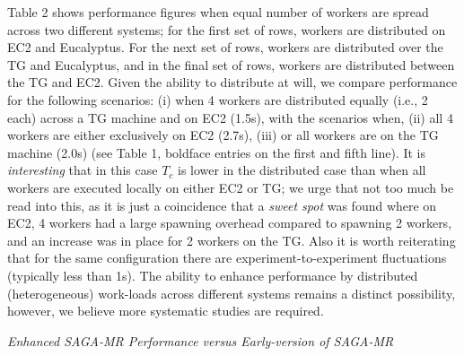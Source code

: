 \documentclass[3p,twocolumn]{elsarticle}
\begin{document}
Table 2 shows performance figures when equal number of workers are
spread across two different systems; for the first set of rows,
workers are distributed on EC2 and Eucalyptus. For the next set of
rows, workers are distributed over the TG and Eucalyptus, and in the
final set of rows, workers are distributed between the TG and EC2.
Given the ability to distribute at will, we compare performance for
the following scenarios: (i) when 4 workers are distributed equally
(i.e., 2 each) across a TG machine and on EC2 (1.5s), with the
scenarios when, (ii) all 4 workers are either exclusively on EC2
(2.7s), (iii) or all workers are on the TG machine (2.0s) (see Table
1, boldface entries on the first and fifth line). It is {\it
  interesting} that in this case $T_c$ is lower in the distributed
case than when all workers are executed locally on either EC2 or TG;
we urge that not too much be read into this, as it is just a
coincidence that a {\it sweet spot} was found where on EC2, 4 workers
had a large spawning overhead compared to spawning 2 workers, and an
increase was in place for 2 workers on the TG. Also it is worth
reiterating that for the same configuration there are
experiment-to-experiment fluctuations (typically less than 1s).  The
ability to enhance performance by distributed (heterogeneous)
work-loads across different systems remains a distinct possibility,
however, we believe more systematic studies are required.


{\it Enhanced SAGA-MR Performance versus Early-version of SAGA-MR}

\end{document}
